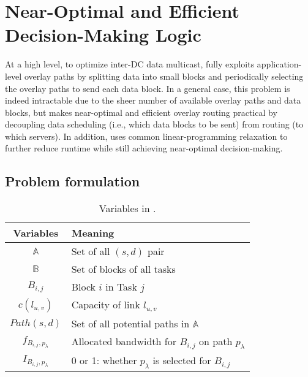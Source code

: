 \section{Near-Optimal and Efficient Decision-Making Logic}
\label{sec:logic}

At a high level, to optimize inter-DC data multicast, \name fully 
exploits application-level overlay paths by splitting data into 
small blocks and periodically selecting the overlay paths to send 
each data block.
In a general case, this problem is indeed intractable due to the 
sheer number of available overlay paths and data blocks, but \name 
makes near-optimal and efficient overlay routing practical by 
decoupling data scheduling (i.e., which data blocks to be sent) 
from routing (to which servers). 
In addition, \name uses common linear-programming relaxation 
to further reduce runtime while still achieving near-optimal
decision-making.



\subsection{Problem formulation}
\label{subsec:logic:formulation}

\begin{table}[t]
\begin{center}
\begin{tabular}{| c | l|}
\hline
 \rowcolor[gray]{0.9}
\textbf{Variables} & \textbf{Meaning} \\
\hline \hline
\textit{$\mathbb{A}$} & Set of all $(s, d)$ pair\\
\hline
\textit{$\mathbb{B}$} & Set of blocks of all tasks\\
\hline
\textit{$B_{i,j}$} & Block $i$ in Task $j$\\
\hline
\textit{$c(l_{u,v})$} & Capacity of link $l_{u,v}$\\
\hline
\textit{$Path(s,d)$} & Set of all potential paths in $\mathbb{A}$\\
\hline
\textit{$f_{B_{i,j},p_\lambda}$} & Allocated bandwidth for $B_{i,j}$ on path $p_\lambda$\\
\hline
\textit{$I_{B_{i,j},p_\lambda}$} & 0 or 1: whether $p_\lambda$ is selected for $B_{i,j}$\\
\hline
\end{tabular}
\end{center}
\caption{Variables in \name.}
\label{table:para}
\end{table}

